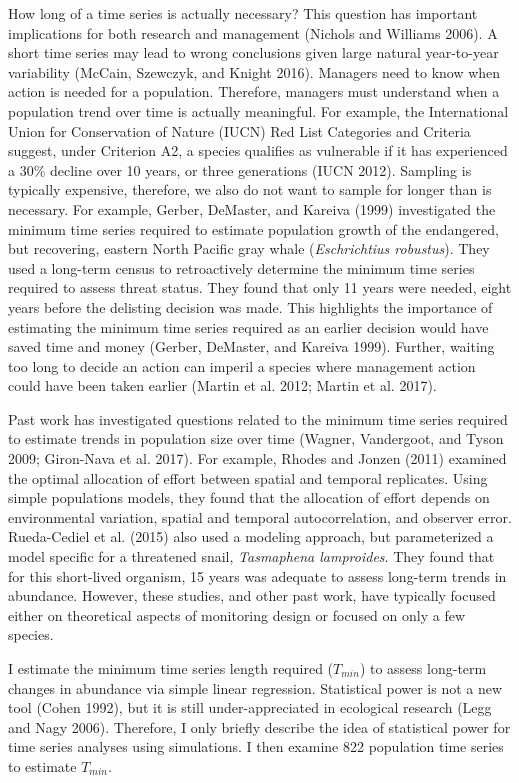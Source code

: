 \documentclass[12pt,]{article}
\begin{document}
How long of a time series is actually necessary? This question has
important implications for both research and management (Nichols and
Williams 2006). A short time series may lead to wrong conclusions given
large natural year-to-year variability (McCain, Szewczyk, and Knight
2016). Managers need to know when action is needed for a population.
Therefore, managers must understand when a population trend over time is
actually meaningful. For example, the International Union for
Conservation of Nature (IUCN) Red List Categories and Criteria suggest,
under Criterion A2, a species qualifies as vulnerable if it has
experienced a 30\% decline over 10 years, or three generations (IUCN
2012). Sampling is typically expensive, therefore, we also do not want
to sample for longer than is necessary. For example, Gerber, DeMaster,
and Kareiva (1999) investigated the minimum time series required to
estimate population growth of the endangered, but recovering, eastern
North Pacific gray whale (\emph{Eschrichtius robustus}). They used a
long-term census to retroactively determine the minimum time series
required to assess threat status. They found that only 11 years were
needed, eight years before the delisting decision was made. This
highlights the importance of estimating the minimum time series required
as an earlier decision would have saved time and money (Gerber,
DeMaster, and Kareiva 1999). Further, waiting too long to decide an
action can imperil a species where management action could have been
taken earlier (Martin et al. 2012; Martin et al. 2017).

Past work has investigated questions related to the minimum time series
required to estimate trends in population size over time (Wagner,
Vandergoot, and Tyson 2009; Giron-Nava et al. 2017). For example, Rhodes
and Jonzen (2011) examined the optimal allocation of effort between
spatial and temporal replicates. Using simple populations models, they
found that the allocation of effort depends on environmental variation,
spatial and temporal autocorrelation, and observer error. Rueda-Cediel
et al. (2015) also used a modeling approach, but parameterized a model
specific for a threatened snail, \emph{Tasmaphena lamproides}. They
found that for this short-lived organism, 15 years was adequate to
assess long-term trends in abundance. However, these studies, and other
past work, have typically focused either on theoretical aspects of
monitoring design or focused on only a few species.

I estimate the minimum time series length required (\(T_{min}\)) to
assess long-term changes in abundance via simple linear regression.
Statistical power is not a new tool (Cohen 1992), but it is still
under-appreciated in ecological research (Legg and Nagy 2006).
Therefore, I only briefly describe the idea of statistical power for
time series analyses using simulations. I then examine 822 population
time series to estimate \(T_{min}\).
\end{document}
